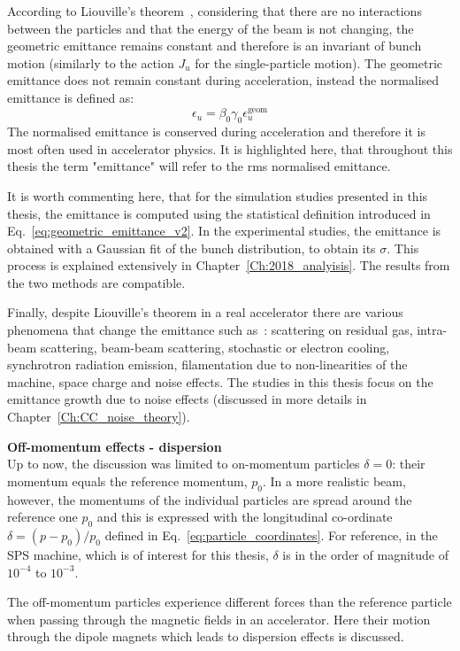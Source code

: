 According to Liouville’s theorem~\cite{wolski2014}, considering that there are no interactions between the particles and that the energy of the beam is not changing, the geometric emittance remains constant and therefore is an invariant of bunch motion (similarly to the action $J_u$ for the single-particle motion). The geometric emittance does not remain constant during acceleration, instead the normalised emittance is defined as:
\begin{equation}\label{eq:normalised_emittance}
    \epsilon_u = \beta_0 \gamma_0 \epsilon^{\mathrm{geom}}_u
\end{equation}
The normalised emittance is conserved during acceleration and therefore it is most often used in accelerator physics. It is highlighted here, that throughout this thesis the term "emittance" will refer to the rms normalised emittance.

It is worth commenting here, that for the simulation studies presented in this thesis, the emittance is computed using the statistical definition introduced in Eq.~\eqref{eq:geometric_emittance_v2}. In the experimental studies, the emittance is obtained with a Gaussian fit of the bunch distribution, to obtain its $\sigma$. This process is explained extensively in Chapter~\ref{Ch:2018_analyisis}. The results from the two methods are compatible.

Finally, despite Liouville’s theorem in a real accelerator there are various phenomena that change the emittance such as~\cite{Buon:216507}: scattering on residual gas, intra-beam scattering, beam-beam scattering, stochastic or electron cooling, synchrotron radiation emission, filamentation due to non-linearities of the machine, space charge and noise effects. The studies in this thesis focus on the emittance growth due to noise effects (discussed in more details in Chapter~\ref{Ch:CC_noise_theory}).

\textbf{Off-momentum effects - dispersion}\\
Up to now, the discussion was limited to on-momentum particles $\delta=0$: their momentum equals the reference momentum, $p_0$. In a more realistic beam, however, the momentums of the individual particles are spread around the reference one $p_0$ and this is expressed with the longitudinal co-ordinate $\delta=(p-p_0)/p_0$ defined in Eq.~\eqref{eq:particle_coordinates}. For reference, in the SPS machine, which is of interest for this thesis, $\delta$ is in the order of magnitude of $10^{-4}$ to $10^{-3}$.

The off-momentum particles experience different forces than the reference particle when passing through the magnetic fields in an accelerator. Here their motion through the dipole magnets which leads to dispersion effects is discussed. 

